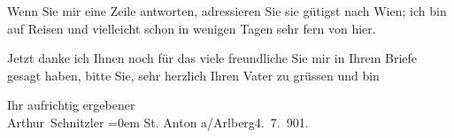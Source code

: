 \pstart
           Wenn Sie mir eine Zeile antworten, adressieren Sie sie gütigst nach Wien; ich bin auf Reisen und vielleicht schon in wenigen Tagen
               sehr fern von hier.\pend
           
\pstart
           Jetzt danke ich Ihnen noch für das viele freundliche \label{T_L01141-1v}\label{T_L01141-1} Sie mir in Ihrem Briefe gesagt haben, bitte Sie,
               sehr herzlich Ihren Vater zu
               grüssen und bin\pend
           
\pstart
           Ihr aufrichtig ergebener{\\[\baselineskip]}\spacefill\mbox{Arthur Schnitzler}\pend
           \leftskip=0em{}
\pstart
           St. Anton a/Arlberg4. 7. 901.\pend
           \endnumbering{}  
      